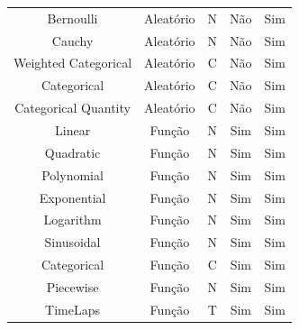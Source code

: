 \documentclass[
	12pt,				%
	openright,			%
	twoside,			%
	a4paper,			%
	english,			%
	brazil				%
	]{abntex2}
\begin{document}
\begin{table}[h]
\begin{tabular}{c|c|c|c|c}
				Bernoulli            & Aleatório  & N\footnotemark[1]                                         & Não        & Sim \\
				Cauchy               & Aleatório  & N\footnotemark[1]                                         & Não        & Sim \\
				Weighted Categorical & Aleatório  & C\footnotemark[2]                                         & Não        & Sim \\
				Categorical          & Aleatório  & C\footnotemark[2]                                         & Não        & Sim \\
				Categorical Quantity & Aleatório  & C\footnotemark[2]                                         & Não        & Sim \\
				Linear               & Função     & N\footnotemark[1]                                         & Sim        & Sim \\
				Quadratic            & Função     & N\footnotemark[1]                                         & Sim        & Sim \\
				Polynomial           & Função     & N\footnotemark[1]                                         & Sim        & Sim \\
				Exponential          & Função     & N\footnotemark[1]                                         & Sim        & Sim \\
				Logarithm            & Função     & N\footnotemark[1]                                         & Sim        & Sim \\
				Sinusoidal           & Função     & N\footnotemark[1]                                         & Sim        & Sim \\
				Categorical          & Função     & C\footnotemark[2]                                         & Sim        & Sim \\
				Piecewise            & Função     & N\footnotemark[1]                                         & Sim        & Sim \\
				TimeLaps             & Função     & T\footnotemark[3]                                         & Sim        & Sim \\

\end{tabular}
\end{table}
\end{document}
